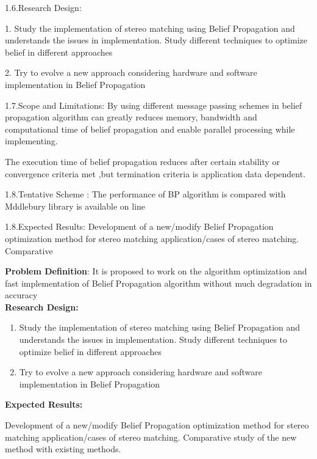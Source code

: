 1.6.Research Design:

1. Study the implementation of stereo matching using Belief Propagation and understands the issues in implementation. Study different techniques to optimize belief in different approaches

2. Try to evolve a new approach considering hardware and software implementation in Belief Propagation




1.7.Scope and Limitations:
By using different message passing schemes in belief propagation algorithm can greatly reduces memory, bandwidth and computational time of belief propagation
and enable parallel processing while implementing.

The execution time of belief propagation reduces after certain stability or convergence criteria met ,but termination criteria is application data dependent.

1.8.Tentative Scheme :
The performance of BP algorithm is compared with Mddlebury library is available on line

1.8.Expected Results: Development of a new/modify Belief Propagation optimization method for stereo matching application/cases of stereo matching. Comparative 



\textbf{Problem Definition}:
It is proposed to work on the algorithm optimization and fast implementation of Belief Propagation algorithm without much degradation in accuracy\\

\textbf{Research Design:}
\begin{enumerate}
\item Study the implementation of stereo matching using Belief Propagation and understands the issues in implementation. Study different techniques to optimize belief in different approaches

\item Try to evolve a new approach considering hardware and software implementation in Belief Propagation
\end{enumerate}

\textbf{Expected Results:}

Development of a new/modify Belief Propagation optimization method for stereo matching application/cases of stereo matching. Comparative study of the new method with existing methods.


















